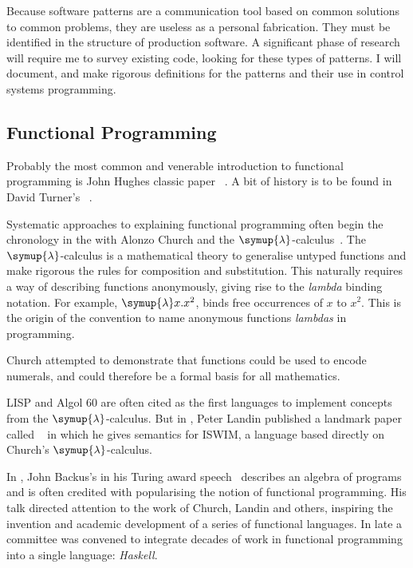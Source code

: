 Because software patterns are a communication tool based on common solutions to
common problems, they are useless as a personal fabrication. They must be
identified in the structure of production software. A significant phase of
research will require me to survey existing code, looking for these types of
patterns. I will document, and make rigorous definitions for the patterns and
their use in control systems programming.



\subsection{Functional Programming}



Probably the most common and venerable introduction to
functional programming is John Hughes classic
paper ~\cite{Hughes1989}. A bit of history is to be found
in David Turner's ~\cite{Turner2013}.

Systematic approaches to explaining functional programming often begin the
chronology in the  with Alonzo Church and the
$\symup{\lambda}$-calculus~\cite{Church1936, Church1941}. The
$\symup{\lambda}$-calculus is a mathematical theory to generalise untyped
functions and make rigorous the rules for composition and substitution. This
naturally requires a way of describing functions anonymously, giving rise to the
\emph{lambda} binding notation. For example,  $\symup{\lambda}x.x^2$, binds free
occurrences of $x$ to $x^2$. This is the origin of the convention to name
anonymous functions \emph{lambdas} in programming.

Church attempted to demonstrate that functions could be used to encode numerals,
and could therefore be a formal basis for all mathematics.

LISP and Algol 60 are often cited as the first languages to implement concepts
from the $\symup{\lambda}$-calculus. But in , Peter Landin published
a landmark paper called ~\cite{landin1966next} in
which he gives semantics for ISWIM, a language based directly on Church's
$\symup{\lambda}$-calculus.

In , John Backus's in his Turing award speech~\cite{Backus1978}
describes an algebra of programs and is often credited with popularising the
notion of functional programming. His talk directed attention to the work of
Church, Landin and others, inspiring the invention and academic development of a
series of functional languages. In late  a committee was convened
to integrate decades of work in functional programming into a single language:
\emph{Haskell}.

